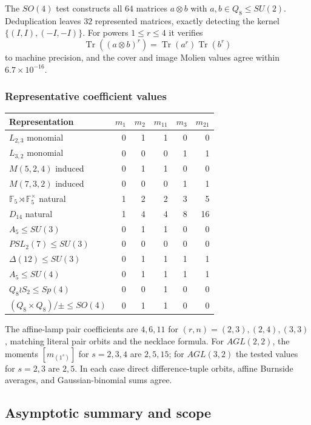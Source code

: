 \documentclass[10pt]{article}
\newcommand{\F}{\mathbb F}
\begin{document}
The $SO(4)$ test constructs all $64$ matrices $a\otimes b$ with
$a,b\in Q_8\leq SU(2)$.  Deduplication leaves $32$ represented matrices,
exactly detecting the kernel $\{(I,I),(-I,-I)\}$.  For powers $1\leq r\leq4$
it verifies
\[
 \operatorname{Tr}((a\otimes b)^r)
 =\operatorname{Tr}(a^r)\operatorname{Tr}(b^r)
\]
to machine precision, and the cover and image Molien values agree within
$6.7\times10^{-16}$.

\subsubsection{Representative coefficient values}

\begin{center}
\small
\begin{tabular}{@{}lrrrrr@{}}
\toprule
Representation & $m_1$ & $m_2$ & $m_{11}$ & $m_3$ & $m_{21}$\\
\midrule
$L_{2,3}$ monomial &0&1&1&0&0\\
$L_{3,2}$ monomial &0&0&0&1&1\\
$M(5,2,4)$ induced &0&1&1&0&0\\
$M(7,3,2)$ induced &0&0&0&1&1\\
$\F_5\rtimes\F_5^\times$ natural &1&2&2&3&5\\
$D_{14}$ natural &1&4&4&8&16\\
$A_5\leq SU(3)$ &0&1&1&0&0\\
$PSL_2(7)\leq SU(3)$ &0&0&0&0&0\\
$\Delta(12)\leq SU(3)$ &0&1&1&1&1\\
$A_5\leq SU(4)$ &0&1&1&1&1\\
$Q_8\wr S_2\leq Sp(4)$ &0&0&1&0&0\\
$(Q_8\times Q_8)/\pm\leq SO(4)$ &0&1&1&0&0\\
\bottomrule
\end{tabular}
\end{center}

The affine-lamp pair coefficients are $4,6,11$ for $(r,n)=(2,3),(2,4),(3,3)$,
matching literal pair orbits and the necklace formula.  For $AGL(2,2)$, the
moments $[m_{(1^s)}]$ for $s=2,3,4$ are $2,5,15$; for $AGL(3,2)$ the tested
values for $s=2,3$ are $2,5$.  In each case direct difference-tuple orbits,
affine Burnside averages, and Gaussian-binomial sums agree.

\subsection{Asymptotic summary and scope}
\end{document}
